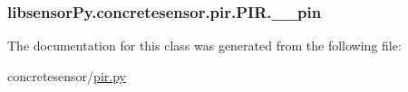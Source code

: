 \subsubsection[{\+\_\+\+\_\+pin}]{\setlength{\rightskip}{0pt plus 5cm}libsensor\+Py.\+concretesensor.\+pir.\+P\+I\+R.\+\_\+\+\_\+pin\hspace{0.3cm}{\ttfamily [private]}}\label{classlibsensorPy_1_1concretesensor_1_1pir_1_1PIR_a1eb2c5437661fbf2ab10226e8be9c2b3}


The documentation for this class was generated from the following file\+:\begin{DoxyCompactItemize}
\item 
concretesensor/\hyperlink{concretesensor_2pir_8py}{pir.\+py}\end{DoxyCompactItemize}
